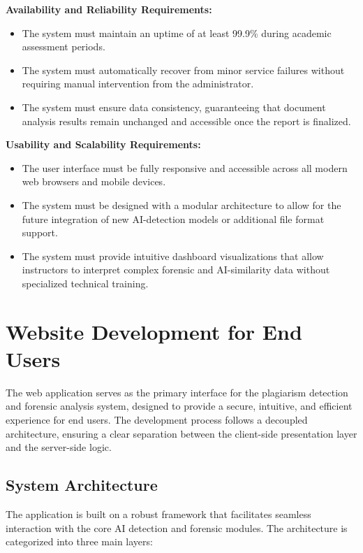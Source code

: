 \documentclass[12pt, a4paper]{report}
\numberwithin{equation}{chapter}
\begin{document}
\textbf{Availability and Reliability Requirements:}

\begin{itemize}

\item The system must maintain an uptime of at least 99.9\% during academic assessment periods.

\item The system must automatically recover from minor service failures without requiring manual intervention from the administrator.

\item The system must ensure data consistency, guaranteeing that document analysis results remain unchanged and accessible once the report is finalized.

\end{itemize}

\textbf{Usability and Scalability Requirements:}

\begin{itemize}

\item The user interface must be fully responsive and accessible across all modern web browsers and mobile devices.

\item The system must be designed with a modular architecture to allow for the future integration of new AI-detection models or additional file format support.

\item The system must provide intuitive dashboard visualizations that allow instructors to interpret complex forensic and AI-similarity data without specialized technical training.

\end{itemize} 

\section{Website Development for End Users}

The web application serves as the primary interface for the plagiarism detection and forensic analysis system, designed to provide a secure, intuitive, and efficient experience for end users. The development process follows a decoupled architecture, ensuring a clear separation between the client-side presentation layer and the server-side logic.

\subsection{System Architecture}
The application is built on a robust framework that facilitates seamless interaction with the core AI detection and forensic modules. The architecture is categorized into three main layers:
\end{document}
